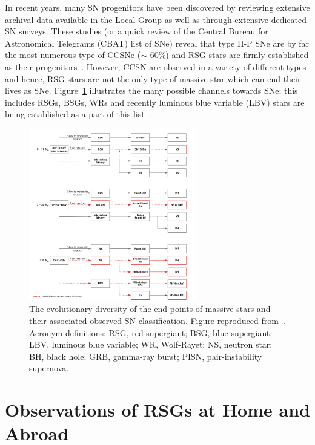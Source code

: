 {In recent years, many SN progenitors have been discovered by reviewing extensive archival data available in the Local Group as well as through extensive dedicated SN surveys.
These studies (or a quick review of the Central Bureau for Astronomical Telegrams (CBAT) list of SNe\footnotemark) reveal that type II-P SNe are by far the most numerous type of CCSNe ($\sim$ 60\%) and RSG stars are firmly established as their progenitors~\citep[][and references therein]{Smartt09}.
However, CCSN are observed in a variety of different types and hence, RSG stars are not the only type of massive star which can end their lives as SNe.
Figure~\ref{fig:SNe-Smartt} illustrates the many possible channels towards SNe; this includes RSGs, BSGs, WRs and recently luminous blue variable (LBV) stars are being established as a part of this list~\citep[e.g.][]{Smartt09, Groh13}.

 \begin{figure}
 \centering
 \includegraphics[width=0.65\textwidth]{intro/Smartt09fig12}
 \caption[Endpoints of massive stars]{The evolutionary diversity of the end points of massive stars and their associated observed SN classification. Figure reproduced from~\cite{Smartt09}. Acronym definitions: RSG, red supergiant; BSG, blue supergiant; LBV, luminous blue variable; WR, Wolf-Rayet; NS, neutron star; BH, black hole; GRB, gamma-ray burst; PISN, pair-instability supernova.
 \label{fig:SNe-Smartt}}
\end{figure}


\section{Observations of RSGs at Home and Abroad} %
\label{sec:rsg_observations}

}
